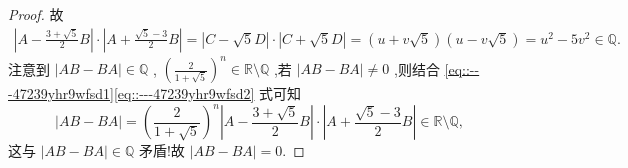 \documentclass[../../main.tex]{subfiles}%
\begin{document}
\begin{proof}
故
\begin{align}
\left| A-\frac{3+\sqrt{5}}{2}B \right|\cdot \left| A+\frac{\sqrt{5}-3}{2}B \right|=\left| C-\sqrt{5}D \right|\cdot \left| C+\sqrt{5}D \right| 
=\left( u+v\sqrt{5} \right) \left( u-v\sqrt{5} \right) =u^2-5v^2\in \mathbb{Q}.
\label{eq::---47239yhr9wfsd2}
\end{align}
注意到 $\left| AB-BA \right|\in \mathbb{Q}$ , $\left( \frac{2}{1+\sqrt{5}} \right) ^n\in \mathbb{R} \setminus \mathbb{Q}$ ,若 $\left| AB-BA \right|\ne 0$ ,则结合 \eqref{eq::---47239yhr9wfsd1}\eqref{eq::---47239yhr9wfsd2} 式可知
$$\left| AB-BA \right|=\left( \frac{2}{1+\sqrt{5}} \right) ^n\left| A-\frac{3+\sqrt{5}}{2}B \right|\cdot \left| A+\frac{\sqrt{5}-3}{2}B \right|\in \mathbb{R} \setminus \mathbb{Q},$$
这与 $\left| AB-BA \right|\in \mathbb{Q}$ 矛盾!故 $\left| AB-BA \right|=0$.

\end{proof}
\end{document}
